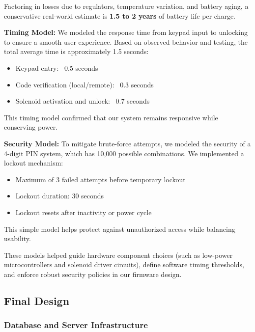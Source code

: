 Factoring in losses due to regulators, temperature variation, and battery aging, a conservative real-world estimate is \textbf{1.5 to 2 years} of battery life per charge.

\textbf{Timing Model:}  
We modeled the response time from keypad input to unlocking to ensure a smooth user experience. Based on observed behavior and testing, the total average time is approximately 1.5 seconds:
\begin{itemize}
    \item Keypad entry: ~0.5 seconds
    \item Code verification (local/remote): ~0.3 seconds
    \item Solenoid activation and unlock: ~0.7 seconds
\end{itemize}

This timing model confirmed that our system remains responsive while conserving power.

\textbf{Security Model:}  
To mitigate brute-force attempts, we modeled the security of a 4-digit PIN system, which has 10,000 possible combinations. We implemented a lockout mechanism:
\begin{itemize}
    \item Maximum of 3 failed attempts before temporary lockout
    \item Lockout duration: 30 seconds
    \item Lockout resets after inactivity or power cycle
\end{itemize}

This simple model helps protect against unauthorized access while balancing usability.

These models helped guide hardware component choices (such as low-power microcontrollers and solenoid driver circuits), define software timing thresholds, and enforce robust security policies in our firmware design.

\subsection{Final Design}






\subsubsection{Database and Server Infrastructure}

